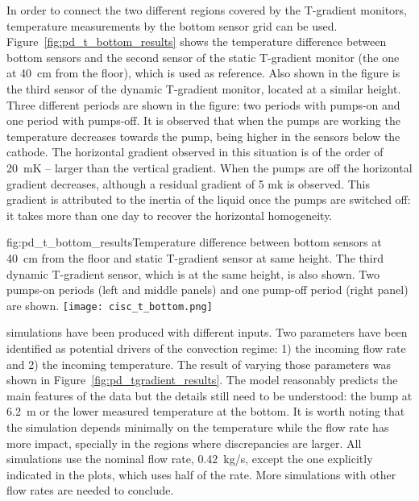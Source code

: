 In order to connect the two different %
regions covered by the T-gradient monitors, temperature measurements by the bottom sensor grid can be used. Figure~\ref{fig:pd_t_bottom_results} shows the temperature difference between bottom sensors and the second sensor of the static T-gradient monitor (the one at 40~cm from the floor), which is used as reference. %
Also shown in the figure is the third sensor of the dynamic T-gradient monitor, located at a similar height. Three different periods are shown in the figure: two periods with pumps-on and one period with pumps-off. It is observed that when the pumps are working the temperature decreases towards the  pump, being  higher in the sensors below the cathode. The horizontal gradient observed in this situation is of the order of 20~mK -- larger than the vertical gradient. When the pumps are off the horizontal gradient decreases, although a residual gradient of 5 mk is observed. This gradient is attributed to the inertia of the liquid once the pumps are switched off: it takes more than one day to recover the horizontal homogeneity.    

\begin{dunefigure}{fig:pd_t_bottom_results}{Temperature difference between bottom sensors at 40~cm from the floor and static T-gradient sensor at same height. The third dynamic T-gradient sensor, which is  at the same height, is also shown. Two pumps-on periods (left and middle panels) and one pump-off period (right panel) are shown.}
  \texttt{[image: cisc\_t\_bottom.png]}%
\end{dunefigure}

 simulations have been produced with different inputs. Two parameters have been identified as potential drivers of the convection regime: 1) the incoming  flow rate and 2) the incoming  temperature. The result of varying those parameters was shown in Figure~\ref{fig:pd_tgradient_results}. 
The  model reasonably predicts the main features of the data but the details still need to be understood: the bump at 6.2~m or the lower measured temperature at the bottom. It is worth noting that the simulation depends minimally on the  temperature while the flow rate has more impact, specially in the regions where discrepancies are larger. All simulations use the nominal  flow rate, 0.42~kg/s, except the one explicitly indicated 
in the plots, which uses half of the rate. More simulations with other  flow rates are needed to conclude.  

